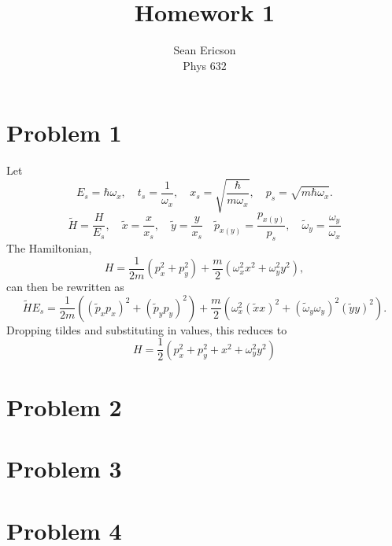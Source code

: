 \documentclass[12pt]{article}
\begin{document}
	
\title{Homework 1}
\author{Sean Ericson \\ Phys 632}
\maketitle

\section*{Problem 1}
Let 
\[ E_s = \hbar\omega_x, \quad t_s = \frac{1}{\omega_x}, \quad x_s = \sqrt{\frac{\hbar}{m\omega_x}}, \quad p_s = \sqrt{m\hbar\omega_x}. \]
\[ \tilde{H} = \frac{H}{E_s}, \quad \tilde{x} = \frac{x}{x_s}, \quad \tilde{y} = \frac{y}{x_s} \quad \tilde{p}_{x(y)} = \frac{p_{x(y)}}{p_s}, \quad \tilde{\omega}_y = \frac{\omega_y}{\omega_x} \]
The Hamiltonian,
\[ H = \frac{1}{2m}\left(p_x^2 + p_y^2\right) + \frac{m}{2}\left(\omega_x^2x^2 + \omega_y^2y^2\right), \]
can then be rewritten as
\[ \tilde{H}E_s = \frac{1}{2m}\left((\tilde{p}_xp_x)^2 + (\tilde{p}_yp_y)^2\right) + \frac{m}{2}\left(\omega_x^2(\tilde{x}x)^2 + (\tilde{\omega}_y\omega_y)^2(\tilde{y}y)^2\right). \] 
Dropping tildes and substituting in values, this reduces to
\[ H = \frac{1}{2}\left(p_x^2 + p_y^2 + x^2 + \omega_y^2y^2\right) \]


\section*{Problem 2}


\section*{Problem 3}


\section*{Problem 4}
\end{document}
